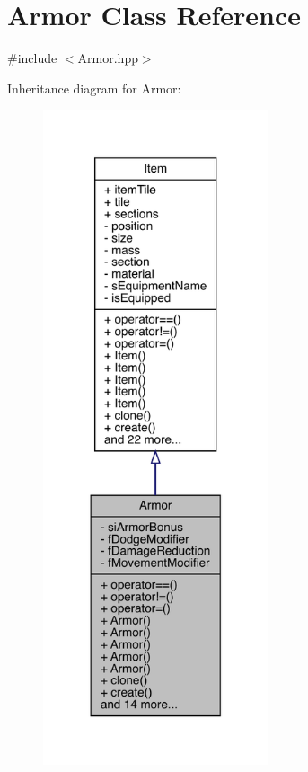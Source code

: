 \hypertarget{class_armor}{}\section{Armor Class Reference}
\label{class_armor}


{\ttfamily \#include $<$Armor.\+hpp$>$}



Inheritance diagram for Armor\+:
\nopagebreak
\begin{figure}[H]
\begin{center}
\leavevmode
\includegraphics[width=188pt]{db/d06/class_armor__inherit__graph}
\end{center}
\end{figure}


